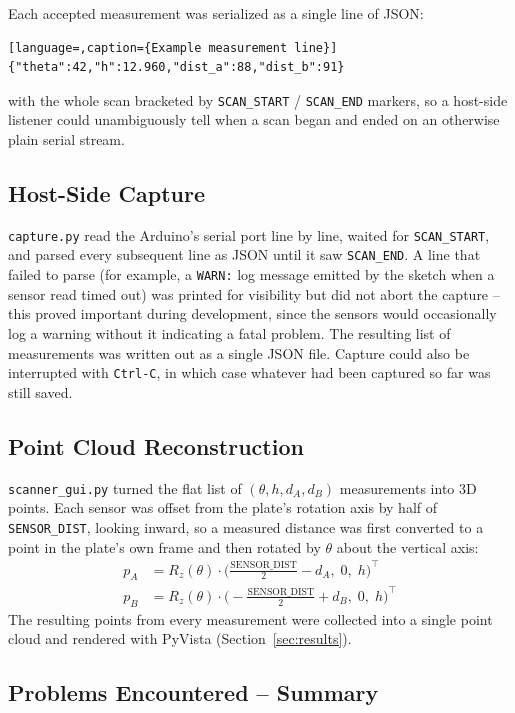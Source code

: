 \documentclass[11pt]{article}
\begin{document}
Each accepted measurement was serialized as a single line of JSON:
\begin{lstlisting}[language=,caption={Example measurement line}]
{"theta":42,"h":12.960,"dist_a":88,"dist_b":91}
\end{lstlisting}
with the whole scan bracketed by \texttt{SCAN\_START} / \texttt{SCAN\_END}
markers, so a host-side listener could unambiguously tell when a scan began
and ended on an otherwise plain serial stream.

\subsection{Host-Side Capture}

\texttt{capture.py} read the Arduino's serial port line by line, waited for
\texttt{SCAN\_START}, and parsed every subsequent line as JSON until it
saw \texttt{SCAN\_END}. A line that failed to parse (for example, a
\texttt{WARN:} log message emitted by the sketch when a sensor read timed
out) was printed for visibility but did not abort the capture -- this
proved important during development, since the sensors would occasionally
log a warning without it indicating a fatal problem. The resulting list of
measurements was written out as a single JSON file. Capture could also be
interrupted with \texttt{Ctrl-C}, in which case whatever had been captured so
far was still saved.

\subsection{Point Cloud Reconstruction}

\texttt{scanner\_gui.py} turned the flat list of
$(\theta, h, d_A, d_B)$ measurements into 3D points. Each sensor was offset
from the plate's rotation axis by half of \texttt{SENSOR\_DIST}, looking
inward, so a measured distance was first converted to a point in the plate's
own frame and then rotated by $\theta$ about the vertical axis:
\begin{align*}
  p_A &= R_z(\theta) \cdot \big(\tfrac{\text{SENSOR\_DIST}}{2} - d_A,\; 0,\; h\big)^\top \\
  p_B &= R_z(\theta) \cdot \big(-\tfrac{\text{SENSOR\_DIST}}{2} + d_B,\; 0,\; h\big)^\top
\end{align*}
The resulting points from every measurement were collected into a single
point cloud and rendered with PyVista (Section~\ref{sec:results}).

\subsection{Problems Encountered -- Summary}
\end{document}
